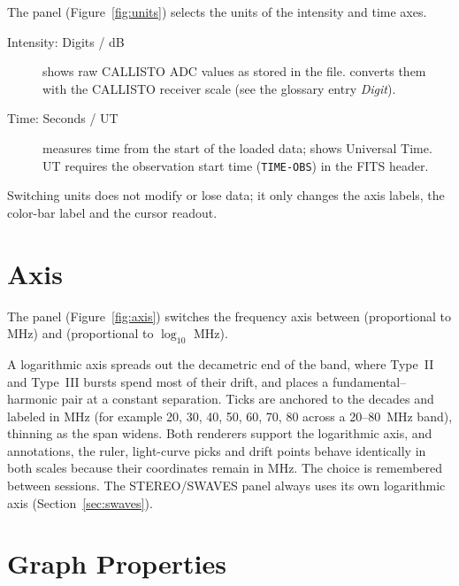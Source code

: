 The  panel (Figure~\ref{fig:units}) selects the units of the intensity and time
axes.


\begin{description}
  \item[Intensity: Digits / dB]  shows raw CALLISTO ADC values as stored in
    the file.  converts them with the CALLISTO receiver scale (see the glossary
    entry \emph{Digit}).
  \item[Time: Seconds / UT]  measures time from the start of the loaded data;
     shows Universal Time. UT requires the observation start time
    (\texttt{TIME-OBS}) in the FITS header.
\end{description}
Switching units does not modify or lose data; it only changes the axis labels, the
color-bar label and the cursor readout.

\section{Axis}
\label{sec:axis}

The  panel (Figure~\ref{fig:axis}) switches the frequency axis between
 (proportional to MHz) and  (proportional to \(\log_{10}\) MHz).


A logarithmic axis spreads out the decametric end of the band, where Type~II and
Type~III bursts spend most of their drift, and places a fundamental--harmonic pair at a
constant separation. Ticks are anchored to the decades and labeled in MHz (for example 20,
30, 40, 50, 60, 70, 80 across a 20--80~MHz band), thinning as the span widens. Both
renderers support the logarithmic axis, and annotations, the ruler, light-curve picks and
drift points behave identically in both scales because their coordinates remain in MHz.
The choice is remembered between sessions. The STEREO/SWAVES panel always uses its own
logarithmic axis (Section~\ref{sec:swaves}).

\section{Graph Properties}
\label{sec:graph-properties}

